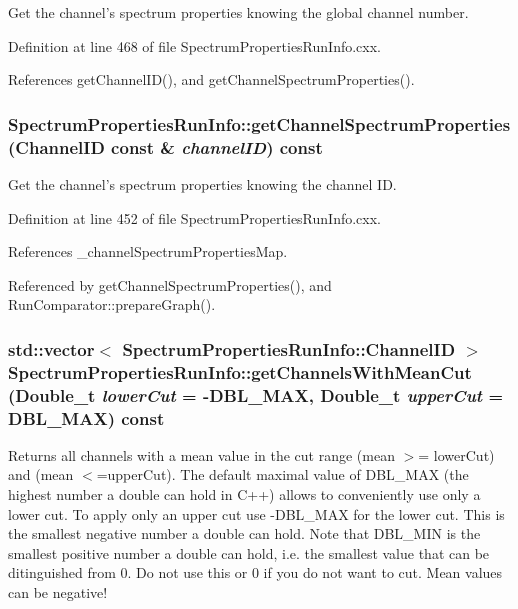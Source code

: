 Get the channel's spectrum properties knowing the global channel number. 

Definition at line 468 of file SpectrumPropertiesRunInfo.cxx.

References getChannelID(), and getChannelSpectrumProperties().\hypertarget{class_spectrum_properties_run_info_a95e79ffad497b11ae35155f516ef7c9b}{
\subsubsection[{getChannelSpectrumProperties}]{ SpectrumPropertiesRunInfo::getChannelSpectrumProperties ({\bf ChannelID} const \& {\em channelID}) const}}
\label{class_spectrum_properties_run_info_a95e79ffad497b11ae35155f516ef7c9b}


Get the channel's spectrum properties knowing the channel ID. 

Definition at line 452 of file SpectrumPropertiesRunInfo.cxx.

References \_\-channelSpectrumPropertiesMap.

Referenced by getChannelSpectrumProperties(), and RunComparator::prepareGraph().\hypertarget{class_spectrum_properties_run_info_a29a7ddfe9965e36250ea137b9b981496}{
\subsubsection[{getChannelsWithMeanCut}]{\setlength{\rightskip}{0pt plus 5cm}std::vector$<$ {\bf SpectrumPropertiesRunInfo::ChannelID} $>$ SpectrumPropertiesRunInfo::getChannelsWithMeanCut (Double\_\-t {\em lowerCut} = {\ttfamily -\/DBL\_\-MAX}, \/  Double\_\-t {\em upperCut} = {\ttfamily DBL\_\-MAX}) const}}
\label{class_spectrum_properties_run_info_a29a7ddfe9965e36250ea137b9b981496}


Returns all channels with a mean value in the cut range (mean $>$= lowerCut) and (mean $<$=upperCut). The default maximal value of DBL\_\-MAX (the highest number a double can hold in C++) allows to conveniently use only a lower cut. To apply only an upper cut use -\/DBL\_\-MAX for the lower cut. This is the smallest negative number a double can hold. Note that DBL\_\-MIN is the smallest positive number a double can hold, i.e. the smallest value that can be ditinguished from 0. Do not use this or 0 if you do not want to cut. Mean values can be negative! 

